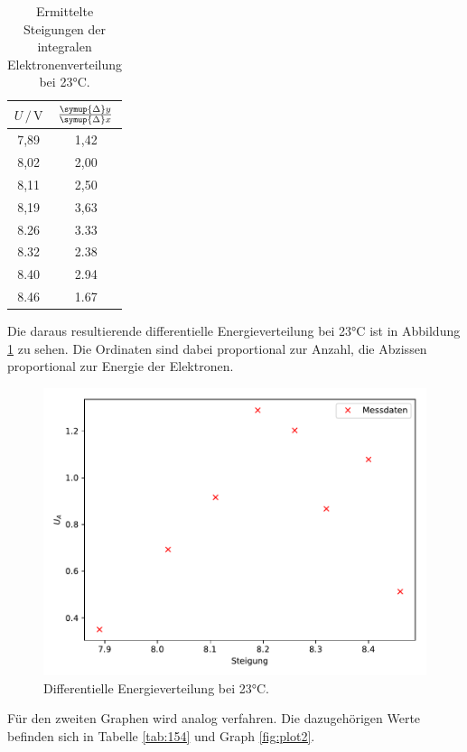 \begin{table}
  \centering
  \caption{Ermittelte Steigungen der integralen Elektronenverteilung bei 23°C.}
  \label{tab:23}
  \begin{tabular}{c c }
  \toprule
  $ U \,/\, \si{\volt} $ & $\frac{\symup{\Delta}y}{\symup{\Delta}x}$\\
  \midrule 
  7,89 & 1,42\\
  8,02 & 2,00\\
  8,11 & 2,50\\
  8,19 & 3,63\\
  8.26 & 3.33\\
  8.32 & 2.38\\
  8.40 & 2.94\\
  8.46 & 1.67\\
  \bottomrule
  \end{tabular}
  \end{table}

Die daraus resultierende differentielle Energieverteilung bei 23°C ist in Abbildung \ref{fig:plot1} zu sehen. 
Die Ordinaten sind dabei proportional zur Anzahl, die Abzissen proportional zur Energie der Elektronen. 

\begin{figure}
  \centering
  \includegraphics{content/plot1.pdf}
  \caption{Differentielle Energieverteilung bei 23°C.}
  \label{fig:plot1}
\end{figure}

Für den zweiten Graphen wird analog verfahren. Die dazugehörigen Werte befinden sich in Tabelle \ref{tab:154}
und Graph \ref{fig:plot2}.

